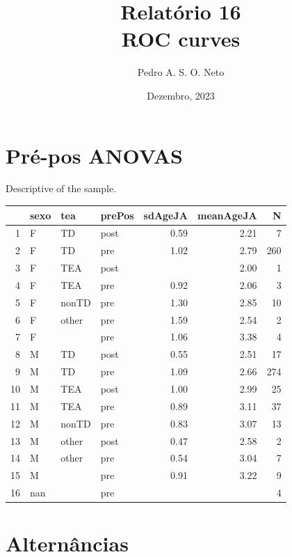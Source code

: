 \documentclass{article}
\title{Relatório 16 \\ ROC curves}
\author{Pedro A. S. O. Neto}
\date{Dezembro, 2023}
\begin{document}
\maketitle

\section{Pré-pos ANOVAS}

Descriptive of the sample. 

\begin{table}[ht]
\centering
\begin{tabular}{rlllrrr}
  \hline
 & sexo & tea & prePos & sdAgeJA & meanAgeJA & N \\ 
  \hline
1 & F & TD & post & 0.59 & 2.21 &   7 \\ 
  2 & F & TD & pre & 1.02 & 2.79 & 260 \\ 
  3 & F & TEA & post &  & 2.00 &   1 \\ 
  4 & F & TEA & pre & 0.92 & 2.06 &   3 \\ 
  5 & F & nonTD & pre & 1.30 & 2.85 &  10 \\ 
  6 & F & other & pre & 1.59 & 2.54 &   2 \\ 
  7 & F &  & pre & 1.06 & 3.38 &   4 \\ 
  8 & M & TD & post & 0.55 & 2.51 &  17 \\ 
  9 & M & TD & pre & 1.09 & 2.66 & 274 \\ 
  10 & M & TEA & post & 1.00 & 2.99 &  25 \\ 
  11 & M & TEA & pre & 0.89 & 3.11 &  37 \\ 
  12 & M & nonTD & pre & 0.83 & 3.07 &  13 \\ 
  13 & M & other & post & 0.47 & 2.58 &   2 \\ 
  14 & M & other & pre & 0.54 & 3.04 &   7 \\ 
  15 & M &  & pre & 0.91 & 3.22 &   9 \\ 
  16 & nan &  & pre &  &  &   4 \\ 
   \hline
\end{tabular}
\end{table}

\section{Alternâncias}
\end{document}
